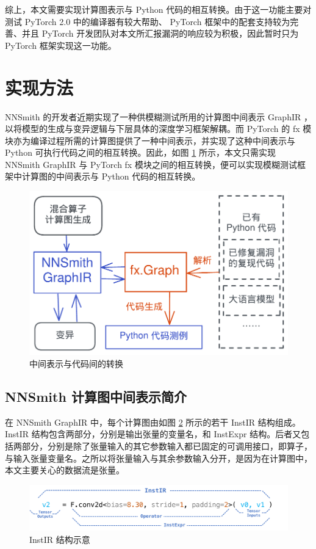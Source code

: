 综上，本文需要实现计算图表示与 Python 代码的相互转换。由于这一功能主要对测试 PyTorch 2.0 中的编译器有较大帮助、 PyTorch 框架中的配套支持较为完善、并且 PyTorch 开发团队对本文所汇报漏洞的响应较为积极，因此暂时只为 PyTorch 框架实现这一功能。

\section{实现方法}

NNSmith 的开发者近期实现了一种供模糊测试所用的计算图中间表示 GraphIR\cite{nnsmith_gir} ，以将模型的生成与变异逻辑与下层具体的深度学习框架解耦。而 PyTorch 的 fx 模块\cite{torch_fx}亦为编译过程所需的计算图提供了一种中间表示，并实现了这种中间表示与 Python 可执行代码之间的相互转换。因此，如图 \ref{fig:convert} 所示，本文只需实现 NNSmith GraphIR 与 PyTorch fx 模块之间的相互转换，便可以实现模糊测试框架中计算图的中间表示与 Python 代码的相互转换。

\begin{figure}
    \centering
    \includegraphics[width=.6\linewidth]{figures/convert.pdf}
    \caption{中间表示与代码间的转换}
    \label{fig:convert}
\end{figure}

\subsection{NNSmith 计算图中间表示简介}

在 NNSmith GraphIR 中，每个计算图由如图 \ref{fig:instir} 所示的若干 InstIR 结构组成。 InstIR 结构包含两部分，分别是输出张量的变量名，和 InstExpr 结构。后者又包括两部分，分别是除了张量输入的其它参数输入都已固定的可调用接口，即算子，与输入张量变量名。之所以将张量输入与其余参数输入分开，是因为在计算图中，本文主要关心的数据流是张量。

\begin{figure}
    \centering
    \includegraphics[width=1.\linewidth]{figures/instir.pdf}
    \caption{InstIR 结构示意}
    \label{fig:instir}
\end{figure}

